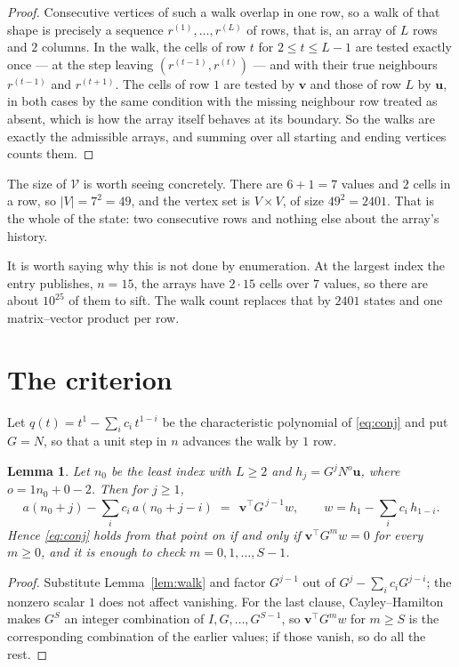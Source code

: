 \documentclass[11pt,a4paper]{article}
\theoremstyle{plain}
\newtheorem{lemma}[theorem]{Lemma}
\theoremstyle{definition}
\begin{document}
\begin{proof}
Consecutive vertices of such a walk overlap in one row, so a walk of that shape is
precisely a sequence $r^{(1)},\dots,r^{(L)}$ of rows, that is, an array of $L$ rows
and $2$ columns. In the walk, the cells of row $t$ for $2\le t\le L-1$ are tested
exactly once --- at the step leaving $(r^{(t-1)},r^{(t)})$ --- and with their true
neighbours $r^{(t-1)}$ and $r^{(t+1)}$. The cells of row $1$ are tested by
$\mathbf{v}$ and those of row $L$ by $\mathbf{u}$, in both cases by the same condition
with the missing neighbour row treated as absent, which is how the array itself behaves at
its boundary. So the walks are exactly the admissible arrays, and summing over all starting
and ending vertices counts them.
\end{proof}


The size of $\mathcal V$ is worth seeing concretely. There are $6+1=7$ values
and $2$ cells in a row, so $|V|=7^{2}=49$, and the vertex set is
$V\times V$, of size $49^2=2401$. That is the whole of the state: two consecutive
rows and nothing else about the array's history.

It is worth saying why this is not done by enumeration. At the largest index the entry
publishes, $n=15$, the arrays have $2\cdot15$ cells over
$7$ values, so there are about $10^{25}$ of them to sift. The
walk count replaces that by $2401$ states and one matrix--vector product per row.
\section{The criterion}

Let $q(t)=t^{1}-\sum_i c_i\,t^{1-i}$ be the characteristic polynomial of
\eqref{eq:conj} and put $G=N$, so that a unit step in $n$ advances the walk by
$1$ row.

\begin{lemma}\label{lem:crit}
Let $n_0$ be the least index with $L\ge2$ and $h_j=G^{j}N^{o}\mathbf{u}$, where
$o=1n_0+0-2$. Then for $j\ge1$,
\[
a(n_0+j)-\sum_i c_i\,a(n_0+j-i)\;=\;\,\mathbf{v}^{\!\top}G^{\,j-1}w,
\qquad w=h_{1}-\sum_i c_i\,h_{1-i} .
\]
Hence \eqref{eq:conj} holds from that point on if and only if
$\mathbf{v}^{\!\top}G^{m}w=0$ for every $m\ge0$, and it is enough to check
$m=0,1,\dots,S-1$.
\end{lemma}

\begin{proof}
Substitute Lemma~\ref{lem:walk} and factor $G^{j-1}$ out of
$G^{j}-\sum_ic_iG^{j-i}$; the nonzero scalar $1$ does not affect
vanishing. For the last clause, Cayley--Hamilton makes $G^{S}$ an integer combination of
$I,G,\dots,G^{S-1}$, so $\mathbf{v}^{\!\top}G^{m}w$ for $m\ge S$ is the corresponding
combination of the earlier values; if those vanish, so do all the rest.
\end{proof}
\end{document}
